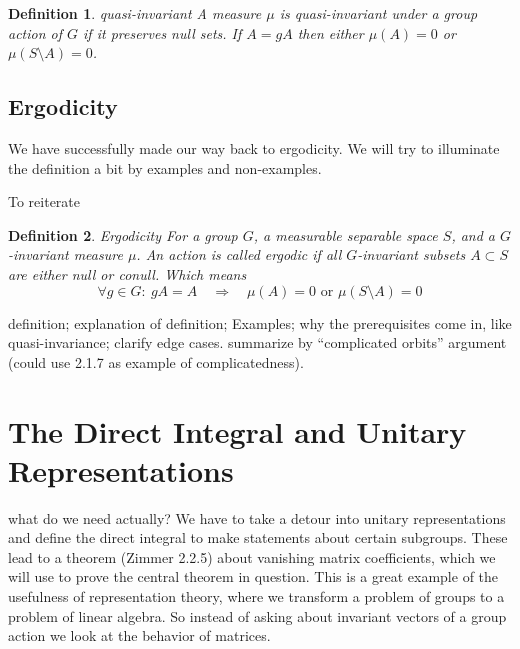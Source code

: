 \documentclass[
]{article}
\newtheorem{defn}{Definition}
\begin{document}
\begin{defn}{quasi-invariant}
A measure $\mu$ is quasi-invariant under a group action of $G$ if it preserves null sets.
If $A = gA$ then either $\mu(A)=0$ or $\mu(S\setminus A)=0$.
\end{defn}

\hypertarget{ergodicity}{%
\subsection{Ergodicity}\label{ergodicity}}

We have successfully made our way back to ergodicity. We will try to
illuminate the definition a bit by examples and non-examples.

To reiterate

\begin{defn}{Ergodicity}
For a group $G$, a measurable separable space $S$, and a $G$-invariant measure $\mu$. An action is called ergodic if all $G$-invariant subsets $A\subset S$ are either null or conull. Which means 
$$
\forall g\in G:\ gA = A \quad \Rightarrow \quad \mu(A)=0 \text{ or } \mu(S\setminus A)=0
$$
\end{defn}

definition; explanation of definition; Examples; why the prerequisites
come in, like quasi-invariance; clarify edge cases. summarize by
``complicated orbits'' argument (could use 2.1.7 as example of
complicatedness).






\hypertarget{the-direct-integral-and-unitary-representations}{%
\section{The Direct Integral and Unitary Representations}\label{the-direct-integral-and-unitary-representations}}

what do we need actually? We have to take a detour into unitary
representations and define the direct integral to make statements about
certain subgroups. These lead to a theorem (Zimmer 2.2.5) about
vanishing matrix coefficients, which we will use to prove the central
theorem in question. This is a great example of the usefulness of
representation theory, where we transform a problem of groups to a
problem of linear algebra. So instead of asking about invariant vectors
of a group action we look at the behavior of matrices.
\end{document}
